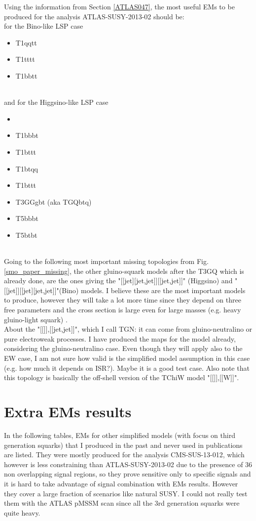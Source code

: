 \documentclass[a4paper,11pt]{article}
\begin{document}
Using the information from Section \ref{ATLAS047}, the most useful EMs to be produced for the analysis ATLAS-SUSY-2013-02 should be:
\\
for the Bino-like LSP case
\begin{itemize}
	\item T1qqtt  \
	\item T1tttt  \
	\item T1bbtt  \
\end{itemize}
\\
and for the Higgsino-like LSP case
\begin{itemize}
	\item \
	\item T1bbbt \
	\item T1bttt \
	\item T1btqq \
	\item T1bttt \
	\item T3GGgbt (aka TGQbtq) \
	\item T5bbbt \
	\item T5btbt \
\end{itemize}
\\

Going to the following most important missing topologies from Fig. \ref{smo_paper_missing}, the other gluino-squark models after the T3GQ which is already done, are the ones giving the "[[jet][jet,jet]][[jet,jet]]" (Higgsino) and "[[jet]][[jet][jet,jet]]"(Bino) models. I believe these are the most important models to produce, however they will take a lot more time since they depend on three free parameters and the cross section is large even for large masses (e.g. heavy gluino-light squark) .
\\

About the "[[]],[[jet,jet]]", which I call TGN: it can come from gluino-neutralino or pure electroweak processes. I have produced the maps for the model already, considering the gluino-neutralino case. Even though they will apply also to the EW case, I am not sure how valid is the simplified model assumption in this case (e.g. how much it depends on ISR?). Maybe it is a good test case.
Also note that this topology is basically the off-shell version of the TChiW model "[[]],[[W]]". 
%
\section{Extra EMs results}
In the following tables, EMs for other simplified models (with focus on third generation squarks) that I produced in the past and never used in publications are listed. They were mostly produced for the analysis CMS-SUS-13-012, which however is less constraining than ATLAS-SUSY-2013-02 due to the presence of 36 non overlapping signal regions, so they prove sensitive only to specific signals and it is hard to take advantage of signal combination with EMs results. However they cover a large fraction of scenarios like natural SUSY. I could not really test them with the ATLAS pMSSM scan since all the 3rd generation squarks were quite heavy.
\\
\end{document}
